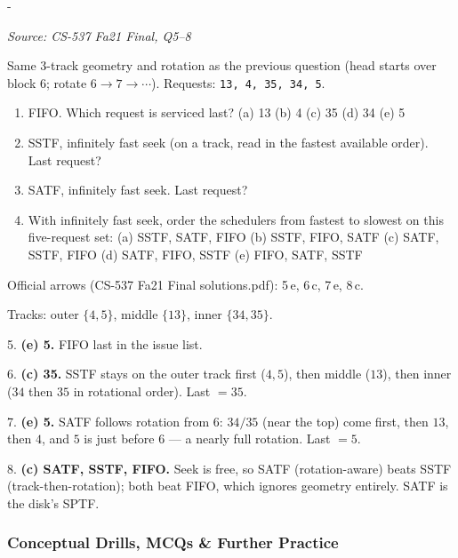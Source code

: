 \documentclass[11pt,a4paper]{article}
\makeatletter
\newcommand{\keepspace}[1]{\par\penalty-100\begingroup
  \setlength{\dimen@}{#1}\dimen@ii\pagegoal\advance\dimen@ii-\pagetotal
  \ifdim\dimen@>\dimen@ii\ifdim\dimen@ii>\z@\vfil\fi\break\fi\endgroup}
\newcounter{qn}[section]
\newenvironment{Qn}[4]{%
  \refstepcounter{qn}\keepspace{7\baselineskip}%
  \begin{tcolorbox}[qboxstyle, title={Q\thesection.\theqn\ \ [#1 \textbar\ #2]\ \ #4}]%
  {\footnotesize\color{g3}\textit{Source: #3}}\par\smallskip%
}{%
  \end{tcolorbox}%
}
\newenvironment{Sol}{%
  \begin{tcolorbox}[sboxstyle, title={Solution}]%
}{%
  \end{tcolorbox}\vspace{0.35em}%
}
\makeatother
\begin{document}
\begin{Qn}{Medium-Hard}{Lect 22}{CS-537 Fa21 Final, Q5--8}{FIFO / SSTF / SATF on the disk simulator (requests 13, 4, 35, 34, 5)}
Same 3-track geometry and rotation as the previous question (head starts
over block 6; rotate $6\to 7\to\cdots$). Requests: \texttt{13, 4, 35, 34, 5}.
\begin{enumerate}
\item[5.] FIFO. Which request is serviced last?
      (a) 13 (b) 4 (c) 35 (d) 34 (e) 5
\item[6.] SSTF, infinitely fast seek (on a track, read in the fastest
      available order). Last request?
\item[7.] SATF, infinitely fast seek. Last request?
\item[8.] With infinitely fast seek, order the schedulers from fastest
      to slowest on this five-request set:
      (a) SSTF, SATF, FIFO\quad
      (b) SSTF, FIFO, SATF\quad
      (c) SATF, SSTF, FIFO\quad
      (d) SATF, FIFO, SSTF\quad
      (e) FIFO, SATF, SSTF
\end{enumerate}
\end{Qn}
\begin{Sol}
Official arrows (CS-537 Fa21 Final solutions.pdf): 5\,e, 6\,c, 7\,e, 8\,c.

Tracks: outer $\{4,5\}$, middle $\{13\}$, inner $\{34,35\}$.

5. \textbf{(e) 5.} FIFO last in the issue list.

6. \textbf{(c) 35.} SSTF stays on the outer track first ($4,5$), then
middle ($13$), then inner ($34$ then $35$ in rotational order). Last
$= 35$.

7. \textbf{(e) 5.} SATF follows rotation from 6: $34/35$ (near the top)
come first, then $13$, then $4$, and $5$ is just before 6 --- a nearly
full rotation. Last $= 5$.

8. \textbf{(c) SATF, SSTF, FIFO.} Seek is free, so SATF (rotation-aware)
beats SSTF (track-then-rotation); both beat FIFO, which ignores geometry
entirely. SATF is the disk's SPTF.
\end{Sol}

\subsubsection*{Conceptual Drills, MCQs \& Further Practice}
\end{document}
